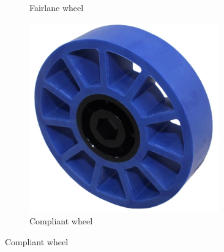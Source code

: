 \documentclass[10pt,letterpaper]{book}
\begin{document}
\begin{figure}[H]
\begin{subfigure}[b]{.19\linewidth}
			\caption{Fairlane wheel}
		\end{subfigure}\begin{subfigure}[b]{.19\linewidth}
			\includegraphics[width=0.9\textwidth]{imgs/wheel_compliant.png}
			\caption{Compliant wheel}
		\end{subfigure}
	\end{figure}
	
\end{document}
